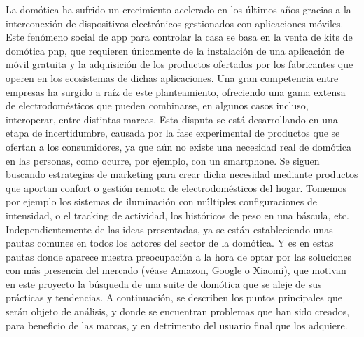 La domótica ha sufrido un crecimiento acelerado en los últimos años gracias a la interconexión de dispositivos electrónicos gestionados con aplicaciones móviles. Este fenómeno social de \gls{app} para controlar la casa se basa en la venta de kits de domótica \Gls{pnp}, que requieren únicamente de la instalación de una aplicación de móvil gratuita y la adquisición de los productos ofertados por los fabricantes que operen en los ecosistemas de dichas aplicaciones. Una gran competencia entre empresas ha surgido a raíz de este planteamiento, ofreciendo una gama extensa de electrodomésticos que pueden combinarse, en algunos casos incluso, interoperar, entre distintas marcas. Esta disputa se está desarrollando en una etapa de incertidumbre, causada por la fase experimental de productos que se ofertan a los consumidores, ya que aún no existe una necesidad real de domótica en las personas, como ocurre, por ejemplo, con un \gls{smartphone}. Se siguen buscando estrategias de marketing para crear dicha necesidad mediante productos que aportan confort o gestión remota de electrodomésticos del hogar. Tomemos por ejemplo los sistemas de iluminación con múltiples configuraciones de intensidad, o el tracking de actividad, los históricos de peso en una báscula, etc. Independientemente de las ideas presentadas, ya se están estableciendo unas pautas comunes en todos los actores del sector de la domótica. Y es en estas pautas donde aparece nuestra preocupación a la hora de optar por las soluciones con más presencia del mercado (véase Amazon, Google o Xiaomi), que motivan en este proyecto la búsqueda de una suite de domótica que se aleje de sus prácticas y tendencias. A continuación, se describen los puntos principales que serán objeto de análisis, y donde se encuentran problemas que han sido creados, para beneficio de las marcas, y en detrimento del usuario final que los adquiere.

\vspace{1cm}

